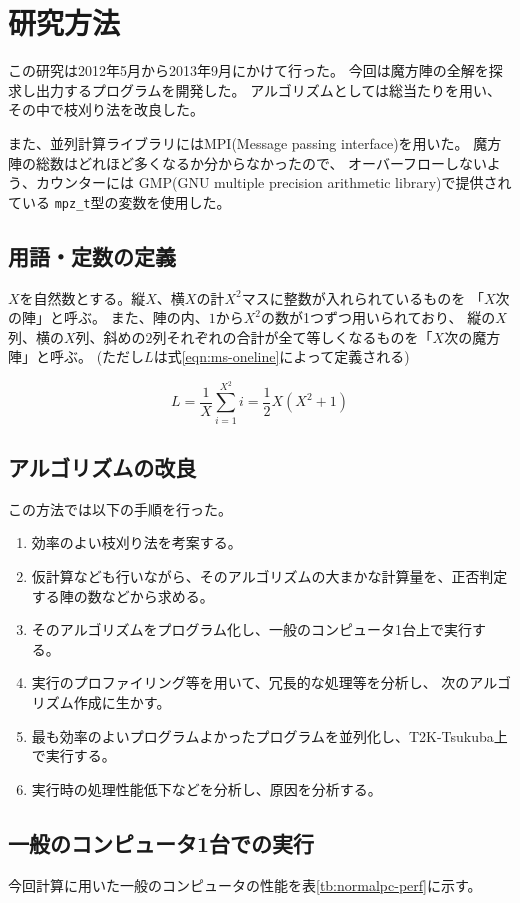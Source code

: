 \section{研究方法}
この研究は2012年5月から2013年9月にかけて行った。
今回は魔方陣の全解を探求し出力するプログラムを開発した。
アルゴリズムとしては総当たりを用い、その中で枝刈り法を改良した。

また、並列計算ライブラリにはMPI(Message passing interface)を用いた。
魔方陣の総数はどれほど多くなるか分からなかったので、
オーバーフローしないよう、カウンターには
GMP(GNU multiple precision arithmetic library)で提供されている
{\tt mpz\_t}型の変数を使用した。

\subsection{用語・定数の定義}
$X$を自然数とする。縦$X$、横$X$の計$X^2$マスに整数が入れられているものを
「$X$次の陣」と呼ぶ。
また、陣の内、$1$から$X^2$の数が1つずつ用いられており、
縦の$X$列、横の$X$列、斜めの$2$列それぞれの合計が全て等しくなるものを「$X$次の魔方陣」と呼ぶ。
(ただし$L$は式\ref{eqn:ms-oneline}によって定義される)

\begin{equation} \label{eqn:ms-oneline}
L=\frac{1}{X} \sum_{i=1}^{X^2}i = \frac{1}{2} X(X^2+1)
\end{equation}


\subsection{アルゴリズムの改良}
この方法では以下の手順を行った。
\begin{enumerate}
	\item 効率のよい枝刈り法を考案する。
	\item 仮計算なども行いながら、そのアルゴリズムの大まかな計算量を、正否判定する陣の数などから求める。
	\item そのアルゴリズムをプログラム化し、一般のコンピュータ1台上で実行する。
	\item 実行のプロファイリング等を用いて、冗長的な処理等を分析し、
	 	次のアルゴリズム作成に生かす。
	\item 最も効率のよいプログラムよかったプログラムを並列化し、T2K-Tsukuba上で実行する。
	\item 実行時の処理性能低下などを分析し、原因を分析する。
\end{enumerate}


\subsection{一般のコンピュータ1台での実行}
今回計算に用いた一般のコンピュータの性能を表\ref{tb:normalpc-perf}に示す。

